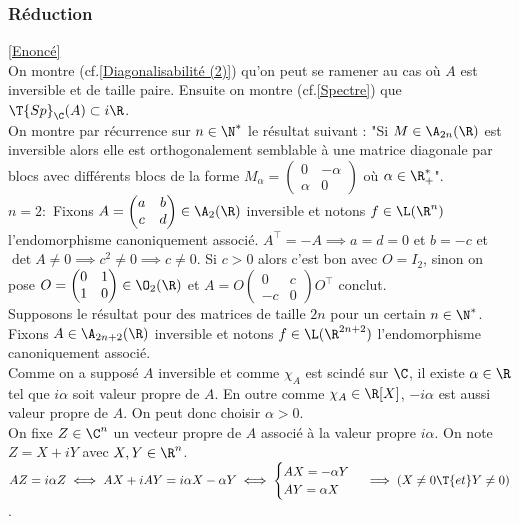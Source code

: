 \documentclass[8pt]{book}
\begin{document}
	\subsubsection{Réduction}
	\label{Réduction corrigé}
	\textcolor{blue}{\hyperref[Réduction]{[Enoncé]}}\\
	On montre (cf.\ref{Diagonalisabilité (2)}) qu'on peut se ramener au cas où $A$ est inversible et de taille paire. Ensuite on montre (cf.\ref{Spectre}) que $\T{Sp}_\C(A)\subset i\R$.\\
	On montre par récurrence sur $n\in \N^*$ le résultat suivant : "Si $M\in \A_{2n}(\R)$ est inversible alors elle est orthogonalement semblable à une matrice diagonale par blocs avec différents blocs de la forme $M_\alpha=\begin{pmatrix}
		0&-\alpha\\
		\alpha&0
	\end{pmatrix}$ où $\alpha\in \R^*_+$".\\
	$n=2 :$ Fixons $A=\begin{pmatrix}
		a&b\\
		c&d
	\end{pmatrix}\in \A_2(\R)$ inversible et notons $f\in \L(\R^n)$ l'endomorphisme canoniquement associé. $A^\top=-A\implies a=d=0$ et $b=-c$ et $\det A\ne 0\implies c^2\ne 0\implies c\ne 0$. Si $c>0$ alors c'est bon avec $O=I_2$, sinon on pose $O=\begin{pmatrix}
		0&1\\
		1&0
	\end{pmatrix}\in \O_2(\R)$ et $A=O\begin{pmatrix}
		0&c\\
		-c&0
	\end{pmatrix}O^\top$ conclut.\\
	Supposons le résultat pour des matrices de taille $2n$ pour un certain $n\in \N^*$. Fixons $A\in \A_{2n+2}(\R)$ inversible et notons $f\in \L(\R^{2n+2})$ l'endomorphisme canoniquement associé.\\
	Comme on a supposé $A$ inversible et comme $\chi_A$ est scindé sur $\C$, il existe $\alpha\in \R$ tel que $i\alpha$ soit valeur propre de $A$. En outre comme $\chi_A\in \R[X]$, $-i\alpha$ est aussi valeur propre de $A$. On peut donc choisir $\alpha>0$.\\
	On fixe $Z\in \C^n$ un vecteur propre de $A$ associé à la valeur propre $i\alpha$. On note $Z=X+iY$ avec $X,Y\in \R^n$.\\
	$AZ=i\alpha Z\iff AX+iAY=i\alpha X-\alpha Y\iff \begin{cases}
		AX=-\alpha Y\\
		AY=\alpha X
	\end{cases}\implies (X\ne 0 \T{ et } Y\ne 0)$.\\
\end{document}
